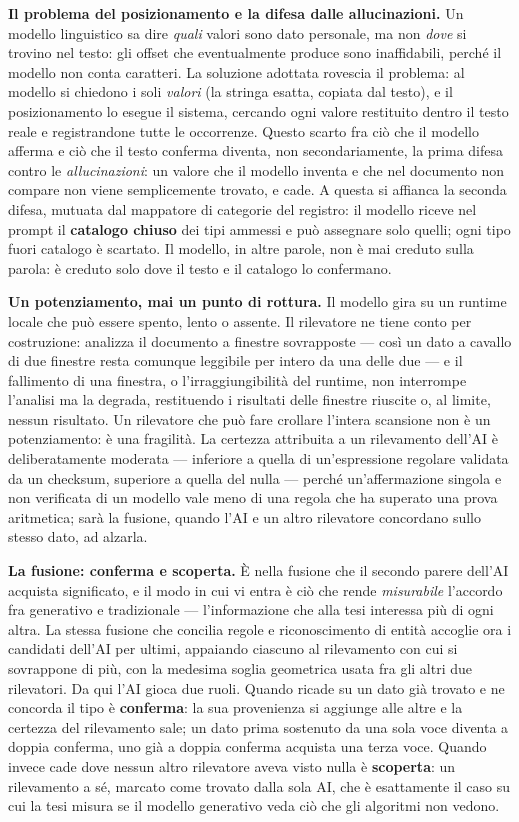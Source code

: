 \textbf{Il problema del posizionamento e la difesa dalle allucinazioni.} Un modello linguistico sa dire \emph{quali} valori sono dato personale, ma non \emph{dove} si trovino nel testo: gli offset che eventualmente produce sono inaffidabili, perché il modello non conta caratteri. La soluzione adottata rovescia il problema: al modello si chiedono i soli \emph{valori} (la stringa esatta, copiata dal testo), e il posizionamento lo esegue il sistema, cercando ogni valore restituito dentro il testo reale e registrandone tutte le occorrenze. Questo scarto fra ciò che il modello afferma e ciò che il testo conferma diventa, non secondariamente, la prima difesa contro le \emph{allucinazioni}: un valore che il modello inventa e che nel documento non compare non viene semplicemente trovato, e cade. A questa si affianca la seconda difesa, mutuata dal mappatore di categorie del registro: il modello riceve nel prompt il \textbf{catalogo chiuso} dei tipi ammessi e può assegnare solo quelli; ogni tipo fuori catalogo è scartato. Il modello, in altre parole, non è mai creduto sulla parola: è creduto solo dove il testo e il catalogo lo confermano. \medskip

\textbf{Un potenziamento, mai un punto di rottura.} Il modello gira su un runtime locale che può essere spento, lento o assente. Il rilevatore ne tiene conto per costruzione: analizza il documento a finestre sovrapposte --- così un dato a cavallo di due finestre resta comunque leggibile per intero da una delle due --- e il fallimento di una finestra, o l'irraggiungibilità del runtime, non interrompe l'analisi ma la degrada, restituendo i risultati delle finestre riuscite o, al limite, nessun risultato. Un rilevatore che può fare crollare l'intera scansione non è un potenziamento: è una fragilità. La certezza attribuita a un rilevamento dell'AI è deliberatamente moderata --- inferiore a quella di un'espressione regolare validata da un checksum, superiore a quella del nulla --- perché un'affermazione singola e non verificata di un modello vale meno di una regola che ha superato una prova aritmetica; sarà la fusione, quando l'AI e un altro rilevatore concordano sullo stesso dato, ad alzarla. \medskip

\textbf{La fusione: conferma e scoperta.} È nella fusione che il secondo parere dell'AI acquista significato, e il modo in cui vi entra è ciò che rende \emph{misurabile} l'accordo fra generativo e tradizionale --- l'informazione che alla tesi interessa più di ogni altra. La stessa fusione che concilia regole e riconoscimento di entità accoglie ora i candidati dell'AI per ultimi, appaiando ciascuno al rilevamento con cui si sovrappone di più, con la medesima soglia geometrica usata fra gli altri due rilevatori. Da qui l'AI gioca due ruoli. Quando ricade su un dato già trovato e ne concorda il tipo è \textbf{conferma}: la sua provenienza si aggiunge alle altre e la certezza del rilevamento sale; un dato prima sostenuto da una sola voce diventa a doppia conferma, uno già a doppia conferma acquista una terza voce. Quando invece cade dove nessun altro rilevatore aveva visto nulla è \textbf{scoperta}: un rilevamento a sé, marcato come trovato dalla sola AI, che è esattamente il caso su cui la tesi misura se il modello generativo veda ciò che gli algoritmi non vedono. \medskip

